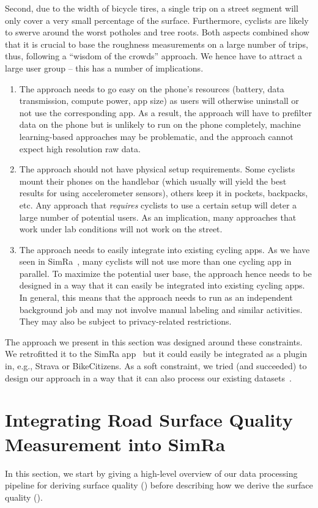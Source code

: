 Second, due to the width of bicycle tires, a single trip on a street segment will only cover a very small percentage of the surface.
Furthermore, cyclists are likely to swerve around the worst potholes and tree roots.
Both aspects combined show that it is crucial to base the roughness measurements on a large number of trips, thus, following a ``wisdom of the crowds'' approach.
We hence have to attract a large user group -- this has a number of implications.
\begin{enumerate}
	\item The approach needs to go easy on the phone's resources (battery, data transmission, compute power, app size) as users will otherwise uninstall or not use the corresponding app. As a result, the approach will have to prefilter data on the phone but is unlikely to run on the phone completely, machine learning-based approaches may be problematic, and the approach cannot expect high resolution raw data.
	\item The approach should not have physical setup requirements. Some cyclists mount their phones on the handlebar (which usually will yield the best results for using accelerometer sensors), others keep it in pockets, backpacks, etc. Any approach that \emph{requires} cyclists to use a certain setup will deter a large number of potential users. As an implication, many approaches that work under lab conditions will not work on the street.
	\item The approach needs to easily integrate into existing cycling apps. As we have seen in SimRa~\cite{karakaya2020simra}, many cyclists will not use more than one cycling app in parallel. To maximize the potential user base, the approach hence needs to be designed in a way that it can easily be integrated into existing cycling apps. In general, this means that the approach needs to run as an independent background job and may not involve manual labeling and similar activities. They may also be subject to privacy-related restrictions.
\end{enumerate}

The approach we present in this section was designed around these constraints.
We retrofitted it to the SimRa app~\cite{karakaya2020simra} but it could easily be integrated as a plugin in, e.g., Strava or BikeCitizens.
As a soft constraint, we tried (and succeeded) to design our approach in a way that it can also process our existing datasets~\cite{dataset_simra_set1,dataset_simra_set2,dataset_simra_set3}.


\section{Integrating Road Surface Quality Measurement into SimRa}
\label{sec:data_processing_pipeline}
In this section, we start by giving a high-level overview of our data processing pipeline for deriving surface quality () before describing how we derive the surface quality ().


